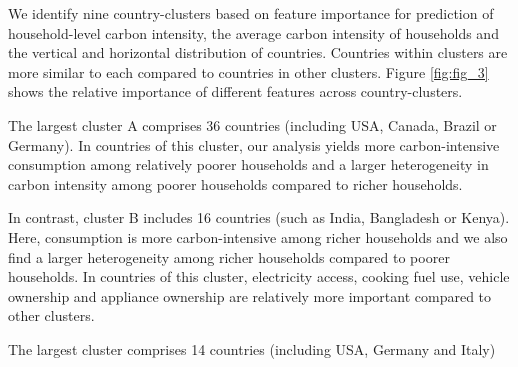 \documentclass[12pt, a4paper]{article}
\begin{document}
We identify nine country-clusters based on feature importance for prediction of household-level carbon intensity, the average carbon intensity of households and the vertical and horizontal distribution of countries. Countries within clusters are more similar to each compared to countries in other clusters. Figure \ref{fig:fig_3} shows the relative importance of different features across country-clusters.

The largest cluster A comprises 36 countries (including USA, Canada, Brazil or Germany). In countries of this cluster, our analysis yields more carbon-intensive consumption among relatively poorer households and a larger heterogeneity in carbon intensity among poorer households compared to richer households. 

In contrast, cluster B includes 16 countries (such as India, Bangladesh or Kenya). Here, consumption is more carbon-intensive among richer households and we also find a larger heterogeneity among richer households compared to poorer households. In countries of this cluster, electricity access, cooking fuel use, vehicle ownership and appliance ownership are relatively more important compared to other clusters.


The largest cluster comprises 14 countries (including USA, Germany and Italy)
\end{document}
